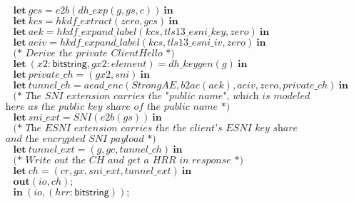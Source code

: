 \documentclass{article}
\theoremstyle{definition}
\newcommand{\kwl}[1]{\mathbf{#1}}
\newcommand{\kwt}[1]{\mathsf{#1}}
\newcommand{\var}[1]{\mathit{#1}}
\theoremstyle{definition}
\begin{document}
\begin{tabbing}
$\ \ \ \ \ \kwl{let}\ \var{gcs} = \var{e2b}(\var{dh{\_}exp}(\var{g}, \var{gs}, \var{c}))\ \kwl{in} $\\
$\ \ \ \ \ \kwl{let}\ \var{kcs} = \var{hkdf{\_}extract}(\var{zero}, \var{gcs})\ \kwl{in} $\\
$\ \ \ \ \ \kwl{let}\ \var{aek} = \var{hkdf{\_}expand{\_}label}(\var{kcs}, \var{tls13{\_}esni{\_}key}, \var{zero})\ \kwl{in} $\\
$\ \ \ \ \ \kwl{let}\ \var{aeiv} = \var{hkdf{\_}expand{\_}label}(\var{kcs}, \var{tls13{\_}esni{\_}iv}, \var{zero})\ \kwl{in} $\\
$ $\\
$\ \ \ \ \ \textit{(* Derive the private ClientHello *)} $\\
$\ \ \ \ \ \kwl{let}\ (\var{x2}{:}\kwt{bitstring}, \var{gx2}{:}\var{element}) = \var{dh{\_}keygen}(\var{g})\ \kwl{in} $\\
$\ \ \ \ \ \kwl{let}\ \var{private{\_}ch} = (\var{gx2}, \var{sni})\ \kwl{in} $\\
$\ \ \ \ \ \kwl{let}\ \var{tunnel{\_}ch} = \var{aead{\_}enc}(\var{StrongAE}, \var{b2ae}(\var{aek}), \var{aeiv}, \var{zero}, \var{private{\_}ch})\ \kwl{in} $\\
$ $\\
$\ \ \ \ \ \textit{(* The SNI extension carries the "public name", which is modeled }$\\
$\textit{        here as the public key share of the public name *)} $\\
$\ \ \ \ \ \kwl{let}\ \var{sni{\_}ext} = \var{SNI}(\var{e2b}(\var{gs}))\ \kwl{in} $\\
$ $\\
$\ \ \ \ \ \textit{(* The ESNI extension carries the the client's ESNI key share}$\\
$\textit{        and the encrypted SNI payload *)} $\\
$\ \ \ \ \ \kwl{let}\ \var{tunnel{\_}ext} = (\var{g}, \var{gc}, \var{tunnel{\_}ch})\ \kwl{in} $\\
$ $\\
$\ \ \ \ \ \textit{(* Write out the CH and get a HRR in response *)} $\\
$\ \ \ \ \ \kwl{let}\ \var{ch} = (\var{cr}, \var{gx}, \var{sni{\_}ext}, \var{tunnel{\_}ext})\ \kwl{in} $\\
$\ \ \ \ \ \kwl{out}(\var{io}, \var{ch}); $\\
$ $\\
$\ \ \ \ \ \kwl{in}\ (\var{io}, (\var{hrr}{:}\kwt{bitstring})); $\\

\end{tabbing}
\end{document}
